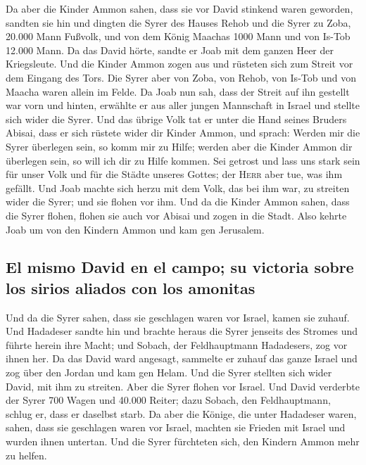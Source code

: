  Da aber die Kinder Ammon sahen, dass sie vor David
stinkend waren geworden, sandten sie hin und dingten die Syrer des
Hauses Rehob und die Syrer zu Zoba, 20.000 Mann Fußvolk, und von dem
König Maachas 1000 Mann und von Is-Tob 12.000 Mann.  Da
das David hörte, sandte er Joab mit dem ganzen Heer der Kriegsleute.
 Und die Kinder Ammon zogen aus und rüsteten sich zum
Streit vor dem Eingang des Tors. Die Syrer aber von Zoba, von Rehob, von
Is-Tob und von Maacha waren allein im Felde.  Da Joab nun
sah, dass der Streit auf ihn gestellt war vorn und hinten, erwählte er
aus aller jungen Mannschaft in Israel und stellte sich wider die Syrer.
 Und das übrige Volk tat er unter die Hand seines Bruders
Abisai, dass er sich rüstete wider dir Kinder Ammon,  und
sprach: Werden mir die Syrer überlegen sein, so komm mir zu Hilfe;
werden aber die Kinder Ammon dir überlegen sein, so will ich dir zu
Hilfe kommen.  Sei getrost und lass uns stark sein für
unser Volk und für die Städte unseres Gottes; der \textsc{Herr} aber
tue, was ihm gefällt.  Und Joab machte sich herzu mit dem
Volk, das bei ihm war, zu streiten wider die Syrer; und sie flohen vor
ihm.  Und da die Kinder Ammon sahen, dass die Syrer
flohen, flohen sie auch vor Abisai und zogen in die Stadt. Also kehrte
Joab um von den Kindern Ammon und kam gen Jerusalem.

\hypertarget{el-mismo-david-en-el-campo-su-victoria-sobre-los-sirios-aliados-con-los-amonitas}{%
\subsection{El mismo David en el campo; su victoria sobre los sirios
aliados con los
amonitas}\label{el-mismo-david-en-el-campo-su-victoria-sobre-los-sirios-aliados-con-los-amonitas}}

 Und da die Syrer sahen, dass sie geschlagen waren vor
Israel, kamen sie zuhauf.  Und Hadadeser sandte hin und
brachte heraus die Syrer jenseits des Stromes und führte herein ihre
Macht; und Sobach, der Feldhauptmann Hadadesers, zog vor ihnen her.
 Da das David ward angesagt, sammelte er zuhauf das ganze
Israel und zog über den Jordan und kam gen Helam. Und die Syrer stellten
sich wider David, mit ihm zu streiten.  Aber die Syrer
flohen vor Israel. Und David verderbte der Syrer 700 Wagen und 40.000
Reiter; dazu Sobach, den Feldhauptmann, schlug er, dass er daselbst
starb.  Da aber die Könige, die unter Hadadeser waren,
sahen, dass sie geschlagen waren vor Israel, machten sie Frieden mit
Israel und wurden ihnen untertan. Und die Syrer fürchteten sich, den
Kindern Ammon mehr zu helfen.

